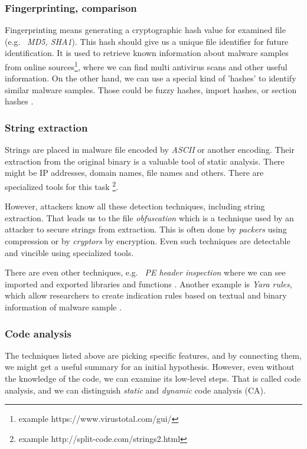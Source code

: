 \subsubsection{Fingerprinting, comparison}
Fingerprinting means generating a cryptographic hash value for examined file (e.g. \ \emph{MD5, SHA1}). This hash should give us a unique file identifier for future identification. It is used to retrieve known information about malware samples from online sources\footnote{example https://www.virustotal.com/gui/}, where we can find multi antivirus scans and other useful information. On the other hand, we can use a special kind of 'hashes' to identify similar malware samples. Those could be fuzzy hashes, import hashes, or section hashes \cite{KA2018}.

\subsubsection{String extraction}
Strings are placed in malware file encoded by \emph{ASCII} or another encoding. Their extraction from the original binary is a valuable tool of static analysis. There might be IP addresses, domain names, file names and others. There are specialized tools for this task \footnote{example http://split-code.com/strings2.html}. 

However, attackers know all these detection techniques, including string extraction. That leads us to the file \emph{obfuscation} which is a technique used by an attacker to secure strings from extraction. This is often done by \emph{packers} using compression or by \emph{cryptors} by encryption. Even such techniques are detectable and vincible using specialized tools.

There are even other techniques, e.g. \ \emph{PE header inspection} where we can see imported and exported libraries and functions \cite{Sikorski2012}. Another example is \emph{Yara rules}, which allow researchers to create indication rules based on textual and binary information of malware sample \cite{KA2018}.

\subsubsection{Code analysis}
The techniques listed above are picking specific features, and by connecting them, we might get a useful summary for an initial hypothesis. 
However, even without the knowledge of the code, we can examine its low-level steps. That is called code analysis, and we can distinguish \emph{static} and \emph{dynamic} code analysis (CA).

